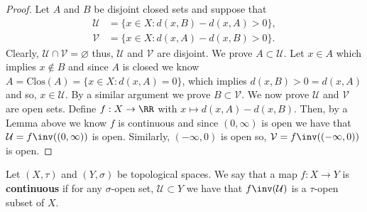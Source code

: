 \documentclass[12pt, a4paper]{article}
\begin{document}
\begin{proof}
    Let \(A\) and \(B\) be disjoint closed sets and suppose that 
    \[\begin{aligned}
        \mathcal{U} &= \{x \in X : d(x,B)-d(x,A)>0\}, \\
        \mathcal{V} &= \{x \in X : d(x,A)-d(x,B)>0\}.
    \end{aligned}\]
    Clearly, \(\mathcal{U} \cap \mathcal{V} = \varnothing\) thus, \(\mathcal{U}\) and \(\mathcal{V}\) are disjoint. We prove \(A \subset \mathcal{U}\). Let \(x \in A\) which implies \(x \not\in B\) and since \(A\) is closed we know \(A = \text{Clos}(A)= \{x \in X : d(x,A)=0\}\), which implies \(d(x,B)>0 = d(x,A)\) and so, \(x \in \mathcal{U}\). By a similar argument we prove \(B \subset \mathcal{V}\). We now prove \(\mathcal{U}\) and \(\mathcal{V}\) are open sets. Define \(f : X \to \RR\) with \(x \mapsto d(x,A)-d(x,B)\). Then, by a Lemma above we know \(f\) is continuous and since \((0,\infty)\) is open we have that \(\mathcal{U} = f\inv((0,\infty))\) is open. Similarly, \((-\infty,0)\) is open so, \(\mathcal{V}=f\inv((-\infty,0))\) is open.
\end{proof}

\begin{definition}
    Let \((X,\tau)\) and \((Y,\sigma)\) be topological spaces. We say that a map \(f:X \to Y\) is \textbf{continuous} if for any \(\sigma\)-open set, \(\mathcal{U} \subset Y\) we have that \(f\inv(\mathcal{U})\) is a \(\tau\)-open subset of \(X\).
\end{definition}
\end{document}
